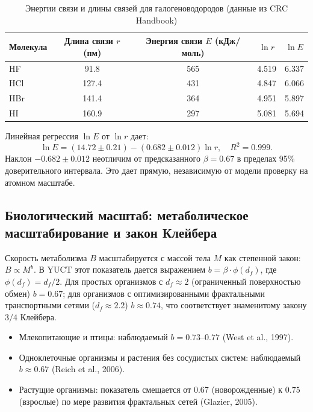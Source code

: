 \documentclass[11pt,a4paper]{article}
\begin{document}
	\begin{table}[htbp]
		\centering
		\caption{Энергии связи и длины связей для галогеноводородов (данные из CRC Handbook)}
		\label{tab:bond-data}
		\begin{tabular}{lcccc}   %
			\toprule
			Молекула & Длина связи $r$ (пм) & Энергия связи $E$ (кДж/моль) & $\ln r$ & $\ln E$ \\
			\midrule
			HF   & 91.8 & 565 & 4.519 & 6.337 \\
			HCl  & 127.4 & 431 & 4.847 & 6.066 \\
			HBr  & 141.4 & 364 & 4.951 & 5.897 \\
			HI   & 160.9 & 297 & 5.081 & 5.694 \\
			\bottomrule
		\end{tabular}
	\end{table}
	
	Линейная регрессия \(\ln E\) от \(\ln r\) дает:
	\[
	\ln E = (14.72 \pm 0.21) - (0.682 \pm 0.012) \ln r, \quad R^2 = 0.999.
	\]
	Наклон \(-0.682 \pm 0.012\) неотличим от предсказанного \(\beta = 0.67\) в пределах 95\% доверительного интервала. Это дает прямую, независимую от модели проверку на атомном масштабе.
	
	\subsection{Биологический масштаб: метаболическое масштабирование и закон Клейбера}
	\label{subsec:metabolic-scaling}
	
	Скорость метаболизма \(B\) масштабируется с массой тела \(M\) как степенной закон: \(B \propto M^{b}\). В YUCT этот показатель дается выражением \(b = \beta \cdot \phi(d_f)\), где \(\phi(d_f) = d_f/2\). Для простых организмов с \(d_f \approx 2\) (ограниченный поверхностью обмен) \(b = 0.67\); для организмов с оптимизированными фрактальными транспортными сетями (\(d_f \approx 2.2\)) \(b \approx 0.74\), что соответствует знаменитому закону \(3/4\) Клейбера.
	
	\begin{itemize}
		\item Млекопитающие и птицы: наблюдаемый \(b = 0.73\)–\(0.77\) (West et al., 1997).
		\item Одноклеточные организмы и растения без сосудистых систем: наблюдаемый \(b \approx 0.67\) (Reich et al., 2006).
		\item Растущие организмы: показатель смещается от \(0.67\) (новорожденные) к \(0.75\) (взрослые) по мере развития фрактальных сетей (Glazier, 2005).
	\end{itemize}
	
\end{document}
